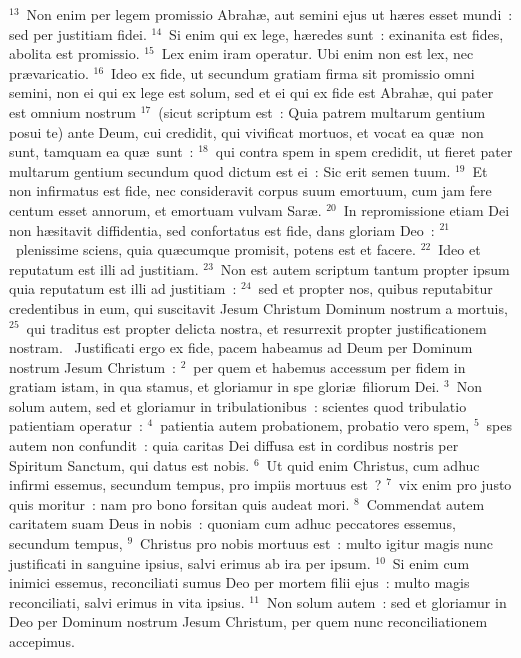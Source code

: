 ${}^{13}$~Non enim per legem promissio Abrah\ae , aut semini ejus ut h\ae res esset mundi~: sed per justitiam fidei.
${}^{14}$~Si enim qui ex lege, h\ae redes sunt~: exinanita est fides, abolita est promissio.
${}^{15}$~Lex enim iram operatur. Ubi enim non est lex, nec pr\ae varicatio.
${}^{16}$~Ideo ex fide, ut secundum gratiam firma sit promissio omni semini, non ei qui ex lege est solum, sed et ei qui ex fide est Abrah\ae , qui pater est omnium nostrum
${}^{17}$~(sicut scriptum est~: Quia patrem multarum gentium posui te) ante Deum, cui credidit, qui vivificat mortuos, et vocat ea qu\ae\ non sunt, tamquam ea qu\ae\ sunt~:
${}^{18}$~qui contra spem in spem credidit, ut fieret pater multarum gentium secundum quod dictum est ei~: Sic erit semen tuum.
${}^{19}$~Et non infirmatus est fide, nec consideravit corpus suum emortuum, cum jam fere centum esset annorum, et emortuam vulvam Sar\ae .
${}^{20}$~In repromissione etiam Dei non h\ae sitavit diffidentia, sed confortatus est fide, dans gloriam Deo~:
${}^{21}$~plenissime sciens, quia qu\ae cumque promisit, potens est et facere.
${}^{22}$~Ideo et reputatum est illi ad justitiam.
${}^{23}$~Non est autem scriptum tantum propter ipsum quia reputatum est illi ad justitiam~:
${}^{24}$~sed et propter nos, quibus reputabitur credentibus in eum, qui suscitavit Jesum Christum Dominum nostrum a mortuis,
${}^{25}$~qui traditus est propter delicta nostra, et resurrexit propter justificationem nostram.
~Justificati ergo ex fide, pacem habeamus ad Deum per Dominum nostrum Jesum Christum~:
${}^{2}$~per quem et habemus accessum per fidem in gratiam istam, in qua stamus, et gloriamur in spe glori\ae\ filiorum Dei.
${}^{3}$~Non solum autem, sed et gloriamur in tribulationibus~: scientes quod tribulatio patientiam operatur~:
${}^{4}$~patientia autem probationem, probatio vero spem,
${}^{5}$~spes autem non confundit~: quia caritas Dei diffusa est in cordibus nostris per Spiritum Sanctum, qui datus est nobis.
${}^{6}$~Ut quid enim Christus, cum adhuc infirmi essemus, secundum tempus, pro impiis mortuus est~?
${}^{7}$~vix enim pro justo quis moritur~: nam pro bono forsitan quis audeat mori.
${}^{8}$~Commendat autem caritatem suam Deus in nobis~: quoniam cum adhuc peccatores essemus, secundum tempus,
${}^{9}$~Christus pro nobis mortuus est~: multo igitur magis nunc justificati in sanguine ipsius, salvi erimus ab ira per ipsum.
${}^{10}$~Si enim cum inimici essemus, reconciliati sumus Deo per mortem filii ejus~: multo magis reconciliati, salvi erimus in vita ipsius.
${}^{11}$~Non solum autem~: sed et gloriamur in Deo per Dominum nostrum Jesum Christum, per quem nunc reconciliationem accepimus.


